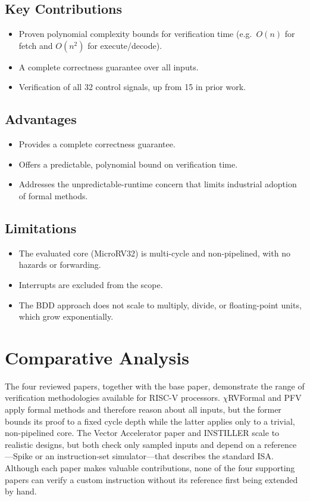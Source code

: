 \documentclass[12pt,a4paper]{report}
\begin{document}
\subsection{Key Contributions}
\begin{itemize}[nosep]
  \item Proven polynomial complexity bounds for verification time (e.g.\ $O(n)$ for
        fetch and $O(n^2)$ for execute/decode).
  \item A complete correctness guarantee over all inputs.
  \item Verification of all 32 control signals, up from 15 in prior work.
\end{itemize}

\subsection{Advantages}
\begin{itemize}[nosep]
  \item Provides a complete correctness guarantee.
  \item Offers a predictable, polynomial bound on verification time.
  \item Addresses the unpredictable-runtime concern that limits industrial adoption of
        formal methods.
\end{itemize}

\subsection{Limitations}
\begin{itemize}[nosep]
  \item The evaluated core (MicroRV32) is multi-cycle and non-pipelined, with no
        hazards or forwarding.
  \item Interrupts are excluded from the scope.
  \item The BDD approach does not scale to multiply, divide, or floating-point units,
        which grow exponentially.
\end{itemize}

\section{Comparative Analysis}
The four reviewed papers, together with the base paper, demonstrate the range of
verification methodologies available for RISC-V processors. $\chi$RVFormal and PFV apply
formal methods and therefore reason about all inputs, but the former bounds its proof to a
fixed cycle depth while the latter applies only to a trivial, non-pipelined core. The
Vector Accelerator paper and INSTILLER scale to realistic designs, but both check only
sampled inputs and depend on a reference---Spike or an instruction-set simulator---that
describes the standard ISA. Although each paper makes valuable contributions, none of the
four supporting papers can verify a custom instruction without its reference first being
extended by hand.
\end{document}
